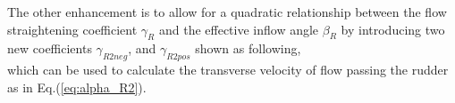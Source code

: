 The other enhancement is to allow for a quadratic relationship between the flow straightening coefficient $\gamma_R$ and the effective inflow angle $\beta_R$ by introducing two new coefficients $\gamma_{R2neg}$, and $\gamma_{R2pos}$ shown as following,  
\begin{equation}
    \label{eq:gamma_R2}
    
\end{equation}
which can be used to calculate the transverse velocity of flow passing the rudder as in Eq.(\ref{eq:alpha_R2}). 
